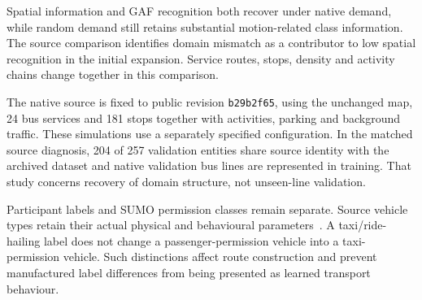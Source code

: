 
Spatial information and GAF recognition both recover under native demand, while random demand still retains substantial motion-related class information. The source comparison identifies domain mismatch as a contributor to low spatial recognition in the initial expansion. Service routes, stops, density and activity chains change together in this comparison.

The native source is fixed to public revision \texttt{b29b2f65}, using the unchanged map, 24 bus services and 181 stops together with activities, parking and background traffic. These simulations use a separately specified configuration. In the matched source diagnosis, 204 of 257 validation entities share source identity with the archived dataset and native validation bus lines are represented in training. That study concerns recovery of domain structure, not unseen-line validation.

Participant labels and SUMO permission classes remain separate. Source vehicle types retain their actual physical and behavioural parameters~\cite{sumovtypes}. A taxi/ride-hailing label does not change a passenger-permission vehicle into a taxi-permission vehicle. Such distinctions affect route construction and prevent manufactured label differences from being presented as learned transport behaviour.
